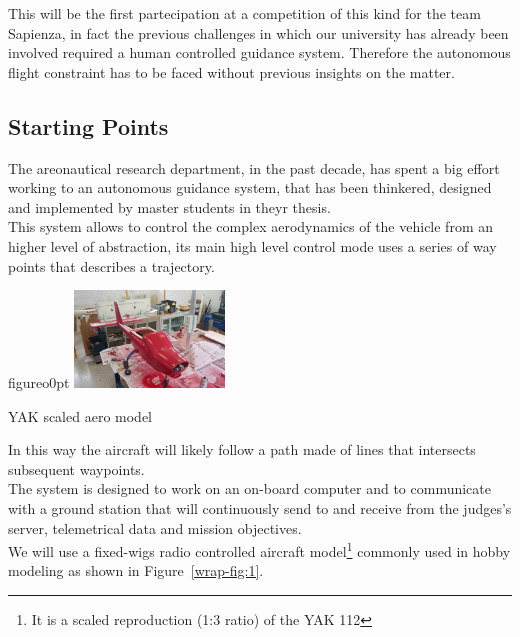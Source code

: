 \documentclass[oneside,onecolumn]{article}
\begin{document}
This will be the first partecipation at a competition of this kind for the team
Sapienza, in fact the previous challenges in which our university has already
been involved required a human controlled guidance system.
Therefore the autonomous flight constraint has to be faced without previous
insights on the matter.

\subsection{Starting Points}
The areonautical research department, in the past decade, has spent a big
effort working to an autonomous guidance system, that has been thinkered,
designed and implemented by master students in theyr thesis.\\
This system allows to control the complex aerodynamics of the vehicle from an
higher level of abstraction, its main high level control mode uses a series of
way points that describes a trajectory.\\

\begin{wrapfloat}{figure}{o}{0pt}
  \includegraphics[width=0.3\textwidth]{YAK1}
  \caption{YAK scaled aero model}\label{wrap-fig:1}
\end{wrapfloat} 


In this way the aircraft will likely follow a path made of lines that intersects subsequent waypoints.\\
The system is designed to work on an on-board computer and to communicate with a
ground station that will continuously send to and receive from the judges's
server, telemetrical data and mission objectives.\\
We will use a fixed-wigs radio controlled aircraft model\footnote{It is a scaled
  reproduction (1:3 ratio) of the YAK 112} commonly used in hobby
modeling as shown in Figure~\ref{wrap-fig:1}.
\end{document}
